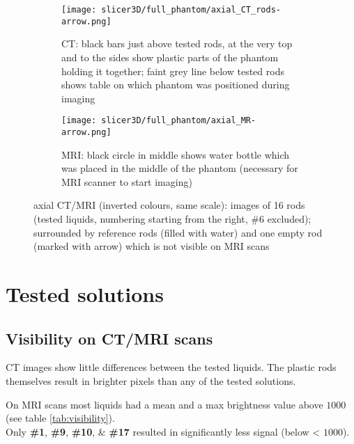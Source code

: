 \begin{figure}[!tbp]
  \begin{subfigure}[b]{\textwidth}
    \texttt{[image: slicer3D/full\_phantom/axial\_CT\_rods-arrow.png]}
    \caption{CT: black bars just above tested rods, at the very top and to the sides show plastic parts of the phantom holding it together; faint grey line below tested rods shows table on which phantom was positioned during imaging}
    \label{fig:axial_CT_rods}
  \end{subfigure}
  \begin{subfigure}[b]{\textwidth}
    \texttt{[image: slicer3D/full\_phantom/axial\_MR-arrow.png]}
    \caption{MRI: black circle in middle shows water bottle which was placed in the middle of the phantom (necessary for MRI scanner to start imaging)}
    \label{fig:axial_MR}
  \end{subfigure}
  \caption{axial CT/MRI (inverted colours, same scale): images of 16 rods (tested liquids, numbering starting from the right, \#6 excluded); surrounded by reference rods (filled with water) and one empty rod (marked with arrow) which is not visible on MRI scans}
  \label{fig:axial}
\end{figure}


\section{Tested solutions}

\subsection{Visibility on CT/MRI scans}

CT images show little differences between the tested liquids. The plastic rods themselves result in brighter pixels than any of the tested solutions.

On MRI scans most liquids had a mean and a max brightness value above $1000$ (see table \ref{tab:visibility}).\\
Only \textbf{\#1}, \textbf{\#9}, \textbf{\#10}, \& \textbf{\#17} resulted in significantly less signal (below < $1000$).


